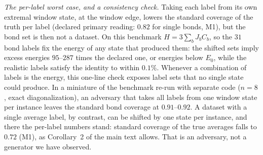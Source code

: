 \documentclass[aps,prx,onecolumn,10pt,nofootinbib,longbibliography,floatfix]{revtex4-2}
\theoremstyle{remark}
\begin{document}
\emph{The per-label worst case, and a consistency check.} Taking each label from its own extremal window state, at the window edge, lowers the standard
coverage of the truth per label (declared primary reading: $0.82$ for single bonds, M1), but the bond set is then %
not a dataset. On this benchmark $H=3\sum_bJ_bC_b$, so the $31$ bond labels fix the energy of any state that %
produced them: the shifted sets imply excess energies $95$--$287$ times the declared one, or energies below $E_0$, %
while the realistic labels satisfy the identity to within $0.1\%$. Whenever a combination of labels is the energy, %
this one-line check exposes label sets that no single state could produce. In a miniature of the benchmark re-run
with separate code ($n=8$, exact diagonalization), an adversary that takes all labels from one window state per %
instance leaves the standard bond coverage at $0.91$--$0.92$. A dataset with a single average label, by contrast, %
can be shifted by one state per instance, and there the per-label numbers stand: standard coverage of the true
averages falls to $0.72$ (M1), as %
Corollary~2 of the main text allows. That is an adversary, not a generator we have observed. %
\end{document}
